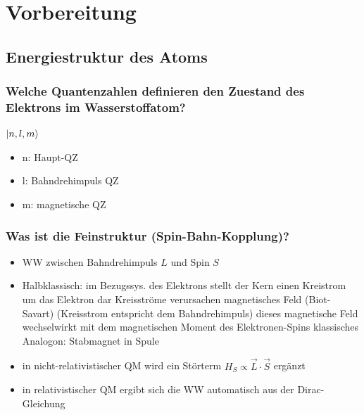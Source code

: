 \section{Vorbereitung}
\label{sec:vorbereitung}


\subsection{Energiestruktur des Atoms}

\subsubsection{Welche Quantenzahlen definieren den Zuestand des Elektrons im Wasserstoffatom?}
$\lvert {n,l,m} \rangle$
\begin{itemize}
    \item n: Haupt-QZ
    \item l: Bahndrehimpuls QZ
    \item m: magnetische QZ
\end{itemize}

\subsubsection{Was ist die Feinstruktur (Spin-Bahn-Kopplung)?}
\begin{itemize}
    \item WW zwischen Bahndrehimpuls $L$ und Spin $S$
    \item Halbklassisch: 
        \to im Bezugssys. des Elektrons stellt der Kern einen Kreistrom um das Elektron dar
        \to Kreisströme verursachen magnetisches Feld (Biot-Savart) (Kreisstrom entspricht dem Bahndrehimpuls)
        \to dieses magnetische Feld wechselwirkt mit dem magnetischen Moment des Elektronen-Spins
        \to klassisches Analogon: Stabmagnet in Spule
    \item in nicht-relativistischer QM wird ein Störterm $H_S\propto\vec{L}\cdot\vec{S}$ ergänzt
    \item in relativistischer QM ergibt sich die WW automatisch aus der Dirac-Gleichung
\end{itemize}

